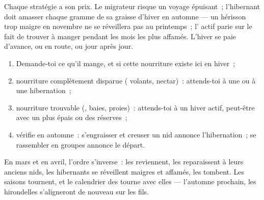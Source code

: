 \begin{remark}\label{rem:g3:animals-through-seasons:cost}
Chaque stratégie a son prix. Le migrateur risque un voyage
épuisant~; l'hibernant doit amasser chaque gramme de sa graisse
d'hiver en automne --- un hérisson trop maigre en novembre ne se
réveillera pas au printemps~; l' actif parie sur le fait de
trouver à manger pendant les mois les plus affamés. L'hiver se paie
d'avance, ou en route, ou jour après jour.
\end{remark}

\begin{method}\label{met:g3:animals-through-seasons:guess}
\begin{enumerate}
  \item Demande-toi ce qu'il mange, et si cette nourriture existe
        ici en hiver~;
  \item nourriture complètement disparue ( volants,
        nectar)~: attends-toi à une  ou à une
        hibernation~;
  \item nourriture trouvable (, baies, proies)~: attends-toi
        à un hiver actif, peut-être avec un  plus épais ou
        des réserves~;
  \item vérifie en automne~: s'engraisser et creuser un nid annonce
        l'hibernation~; se rassembler en groupes annonce le départ.
\end{enumerate}
\end{method}

\begin{example}\label{ex:g3:animals-through-seasons:spring}
En mars et en avril, l'ordre s'inverse~: les  reviennent,
les  reparaissent à leurs anciens nids, les hibernants se
réveillent maigres et affamés, les  tombent. Les
saisons tournent, et le calendrier des  tourne avec elles ---
l'automne prochain, les hirondelles s'aligneront de nouveau sur les
fils.
\end{example}

